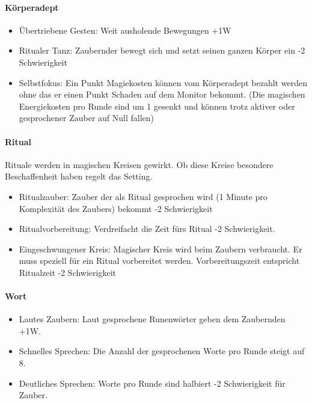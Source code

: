 \documentclass{article}
\begin{document}
\paragraph{Körperadept}

\begin{itemize}
\item Übertriebene Gesten: Weit ausholende Bewegungen +1W
\item Ritualer Tanz: Zaubernder bewegt sich und setzt seinen ganzen Körper ein -2 Schwierigkeit
\item Selbstfokus: Ein Punkt Magiekosten können vom Körperadept bezahlt werden ohne das er einen Punkt Schaden auf dem Monitor bekommt. (Die magischen Energiekosten pro Runde sind um 1 gesenkt und können trotz aktiver oder gesprochener Zauber auf Null fallen)
\end{itemize}

\paragraph{Ritual}

Rituale werden in magischen Kreisen gewirkt. Ob diese Kreise besondere Beschaffenheit haben regelt das Setting.

\begin{itemize}
\item Ritualzauber: Zauber der als Ritual gesprochen wird (1 Minute pro Komplexität des Zaubers) bekommt -2 Schwierigkeit
\item Ritualvorbereitung: Verdreifacht die Zeit fürs Ritual -2 Schwierigkeit.
\item Eingeschwungener Kreis: Magischer Kreis wird beim Zaubern verbraucht. Er muss speziell für ein Ritual vorbereitet werden. Vorbereitungszeit entspricht Ritualzeit -2 Schwierigkeit
\end{itemize}

\paragraph{Wort}

\begin{itemize}
\item Lautes Zaubern: Laut gesprochene Runenwörter geben dem Zaubernden +1W.
\item Schnelles Sprechen: Die Anzahl der gesprochenen Worte pro Runde steigt auf 8.
\item Deutliches Sprechen: Worte pro Runde sind halbiert -2 Schwierigkeit für Zauber.
\end{itemize}
\end{document}
